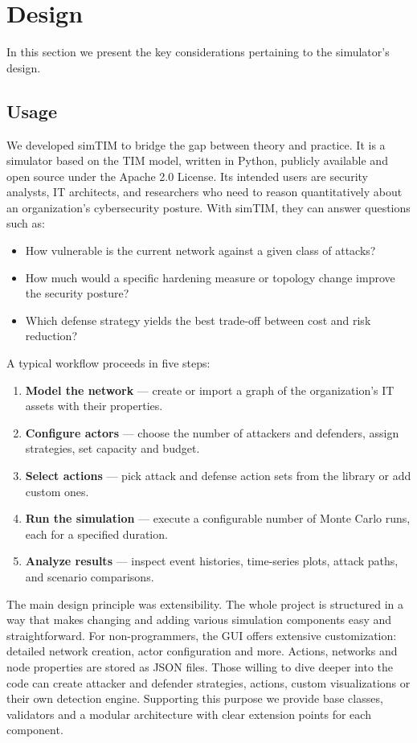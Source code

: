 \documentclass{llncs}
\begin{document}
\section{Design}
In this section we present the key considerations pertaining to the simulator's design.
\subsection{Usage}
We developed simTIM to bridge the gap between theory and practice. It is a simulator based on the TIM model, written in Python, publicly available and open source under the Apache 2.0 License.
Its intended users are security analysts, IT architects, and researchers who need to reason quantitatively about an organization's cybersecurity posture. With simTIM, they can answer questions such as:
\begin{itemize}
  \item How vulnerable is the current network against a given class of attacks?
  \item How much would a specific hardening measure or topology change improve the security posture?
  \item Which defense strategy yields the best trade-off between cost and risk reduction?
\end{itemize}

A typical workflow proceeds in five steps:
\begin{enumerate}
  \item \textbf{Model the network} --- create or import a graph of the organization's IT assets with their properties.
  \item \textbf{Configure actors} --- choose the number of attackers and defenders, assign strategies, set capacity and budget.
  \item \textbf{Select actions} --- pick attack and defense action sets from the library or add custom ones.
  \item \textbf{Run the simulation} --- execute a configurable number of Monte Carlo runs, each for a specified duration.
  \item \textbf{Analyze results} --- inspect event histories, time-series plots, attack paths, and scenario comparisons.
\end{enumerate}

The main design principle was extensibility. The whole project is structured in a way that makes changing and adding various simulation components easy and straightforward.
For non-programmers, the GUI offers extensive customization: detailed network creation, actor configuration and more. Actions, networks and node properties are stored as JSON files.
Those willing to dive deeper into the code can create attacker and defender strategies, actions, custom visualizations or their own detection engine.
Supporting this purpose we provide base classes, validators and a modular architecture with clear extension points for each component.
\end{document}
